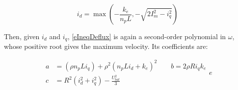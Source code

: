 \documentclass[a4paper,10pt]{article}
\begin{document}
\begin{equation}
	i_d = \max \left(-\frac{k_e}{n_p L}, -\sqrt{2 I_m^2 - i_q^2} \right)
\end{equation}

Then, given $i_d$ and $i_q$, \eqref{eIneqDeflux} is again a second-order polynomial in $\omega$, whose positive root gives the maximum velocity. Its coefficients are:

\begin{equation}
	\begin{aligned}
		a &= (\rho n_p L i_q) + \rho^2(n_p L i_d + k_e)^2 \qquad 
		b = 2 \rho R i_q k_e \\ 
		c &= R^2 (i_d^2 + i_q^2) - \frac{U_{bat}^2}{3}
	\end{aligned}e
\end{equation}
\end{document}
